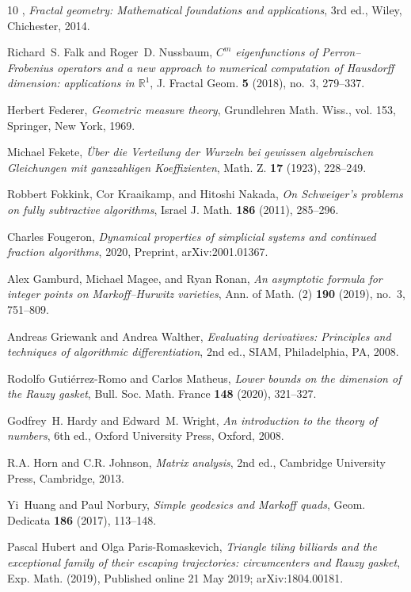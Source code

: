 \documentclass[11pt]{amsart}
\theoremstyle{definition}
\theoremstyle{remark}
\begin{document}
\begin{thebibliography}{10}
\bysame, \emph{Fractal geometry: Mathematical foundations and applications},
  3rd ed., Wiley, Chichester, 2014.

Richard~S. Falk and Roger~D. Nussbaum, \emph{{$C^m$} eigenfunctions of
  {P}erron--{F}robenius operators and a new approach to numerical computation
  of {H}ausdorff dimension: applications in $\mathbb{R}^1$}, J. Fractal Geom.
  \textbf{5} (2018), no.~3, 279--337.

Herbert Federer, \emph{Geometric measure theory}, Grundlehren Math. Wiss., vol.
  153, Springer, New York, 1969.

Michael Fekete, \emph{{\"U}ber die {V}erteilung der {W}urzeln bei gewissen
  algebraischen {G}leichungen mit ganzzahligen {K}oeffizienten}, Math. Z.
  \textbf{17} (1923), 228--249.

Robbert Fokkink, Cor Kraaikamp, and Hitoshi Nakada, \emph{On {S}chweiger's
  problems on fully subtractive algorithms}, Israel J. Math. \textbf{186}
  (2011), 285--296.

Charles Fougeron, \emph{Dynamical properties of simplicial systems and
  continued fraction algorithms}, 2020, Preprint, arXiv:2001.01367.

Alex Gamburd, Michael Magee, and Ryan Ronan, \emph{An asymptotic formula for
  integer points on {M}arkoff--{H}urwitz varieties}, Ann. of Math. (2)
  \textbf{190} (2019), no.~3, 751--809.

Andreas Griewank and Andrea Walther, \emph{Evaluating derivatives: Principles
  and techniques of algorithmic differentiation}, 2nd ed., SIAM, Philadelphia,
  PA, 2008.

Rodolfo Guti{\'e}rrez-Romo and Carlos Matheus, \emph{Lower bounds on the
  dimension of the {R}auzy gasket}, Bull. Soc. Math. France \textbf{148}
  (2020), 321--327.

Godfrey~H. Hardy and Edward~M. Wright, \emph{An introduction to the theory of
  numbers}, 6th ed., Oxford University Press, Oxford, 2008.

R.A. Horn and C.R. Johnson, \emph{Matrix analysis}, 2nd ed., Cambridge
  University Press, Cambridge, 2013.

Yi~Huang and Paul Norbury, \emph{Simple geodesics and {M}arkoff quads}, Geom.
  Dedicata \textbf{186} (2017), 113--148.

Pascal Hubert and Olga Paris-Romaskevich, \emph{Triangle tiling billiards and
  the exceptional family of their escaping trajectories: circumcenters and
  {R}auzy gasket}, Exp. Math. (2019), Published online 21 May 2019;
  arXiv:1804.00181.


\end{thebibliography}
\end{document}
